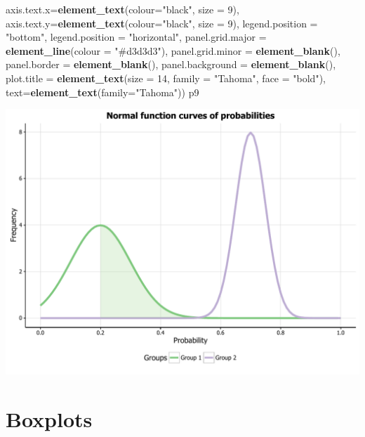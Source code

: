 \documentclass[]{article}
\newenvironment{Shaded}{\begin{snugshade}}{\end{snugshade}}
\newcommand{\KeywordTok}[1]{\textcolor[rgb]{0.13,0.29,0.53}{\textbf{{#1}}}}
\newcommand{\DataTypeTok}[1]{\textcolor[rgb]{0.13,0.29,0.53}{{#1}}}
\newcommand{\DecValTok}[1]{\textcolor[rgb]{0.00,0.00,0.81}{{#1}}}
\newcommand{\StringTok}[1]{\textcolor[rgb]{0.31,0.60,0.02}{{#1}}}
\newcommand{\NormalTok}[1]{{#1}}
\begin{document}
\begin{Shaded}
\begin{Highlighting}[]
            \DataTypeTok{axis.text.x=}\KeywordTok{element_text}\NormalTok{(}\DataTypeTok{colour=}\StringTok{"black"}\NormalTok{, }\DataTypeTok{size =} \DecValTok{9}\NormalTok{), }
            \DataTypeTok{axis.text.y=}\KeywordTok{element_text}\NormalTok{(}\DataTypeTok{colour=}\StringTok{"black"}\NormalTok{, }\DataTypeTok{size =} \DecValTok{9}\NormalTok{), }
            \DataTypeTok{legend.position =} \StringTok{"bottom"}\NormalTok{, }\DataTypeTok{legend.position =} \StringTok{"horizontal"}\NormalTok{,}
            \DataTypeTok{panel.grid.major =} \KeywordTok{element_line}\NormalTok{(}\DataTypeTok{colour =} \StringTok{"#d3d3d3"}\NormalTok{), }
            \DataTypeTok{panel.grid.minor =} \KeywordTok{element_blank}\NormalTok{(), }
            \DataTypeTok{panel.border =} \KeywordTok{element_blank}\NormalTok{(), }\DataTypeTok{panel.background =} \KeywordTok{element_blank}\NormalTok{(),}
            \DataTypeTok{plot.title =} \KeywordTok{element_text}\NormalTok{(}\DataTypeTok{size =} \DecValTok{14}\NormalTok{, }\DataTypeTok{family =} \StringTok{"Tahoma"}\NormalTok{, }\DataTypeTok{face =} \StringTok{"bold"}\NormalTok{),}
            \DataTypeTok{text=}\KeywordTok{element_text}\NormalTok{(}\DataTypeTok{family=}\StringTok{"Tahoma"}\NormalTok{))}
\NormalTok{p9}
\end{Highlighting}
\end{Shaded}

\begin{center}\includegraphics{0_all_posts_pdf/function_18-1} \end{center}

\section{Boxplots}\label{boxplots}
\end{document}
